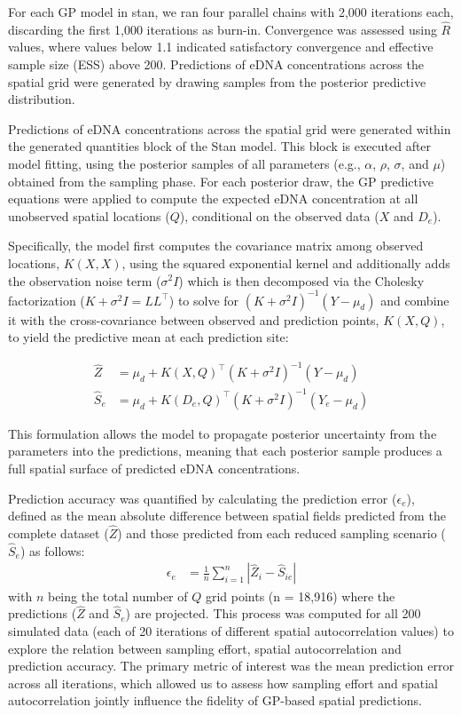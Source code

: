 \documentclass{article}
\begin{document}
For each GP model in stan, we ran four parallel chains with 2,000 iterations each, discarding the first 1,000 iterations as burn-in. Convergence was assessed using $\hat{R}$ values, where values below 1.1 indicated satisfactory convergence and effective sample size (ESS) above 200. Predictions of eDNA concentrations across the spatial grid were generated by drawing samples from the posterior predictive distribution.


Predictions of eDNA concentrations across the spatial grid were generated within the generated quantities block of the Stan model. This block is executed after model fitting, using the posterior samples of all parameters (e.g., $\alpha$, $\rho$, $\sigma$, and $\mu$) obtained from the sampling phase. For each posterior draw, the GP predictive equations were applied to compute the expected eDNA concentration at all unobserved spatial locations ($Q$), conditional on the observed data ($X$ and $D_e$).

Specifically, the model first computes the covariance matrix among observed locations, $K(X, X)$, using the squared exponential kernel and additionally adds the observation noise term ($\sigma^2 I$) which is then decomposed via the Cholesky factorization ($K + \sigma^2 I = LL^\top$) to solve for $(K + \sigma^2 I)^{-1}(Y - \mu_d)$ and combine it with the cross-covariance between observed and prediction points, $K(X, Q)$, to yield the predictive mean at each prediction site:

\begin{align}
\hat{Z} &= \mu_d + K(X, Q)^\top (K + \sigma^2 I)^{-1}(Y - \mu_d) \label{eq:Zhat} \\
\hat{S}_e &= \mu_d + K(D_e, Q)^\top (K + \sigma^2 I)^{-1}(Y_e - \mu_d) \label{eq:Shat}
\end{align}

This formulation allows the model to propagate posterior uncertainty from the parameters into the predictions, meaning that each posterior sample produces a full spatial surface of predicted eDNA concentrations. 

Prediction accuracy was quantified by calculating the prediction error ($\epsilon_e$), defined as the mean absolute difference between spatial fields predicted from the complete dataset ($\hat{Z}$) and those predicted from each reduced sampling scenario ($\hat{S}_e$) as follows:
\begin{align}
\epsilon_e &= \frac{1}{n} \sum_{i=1}^{n}{| \hat{Z}_i - \hat{S}_{ie}|}
\end{align}
with $n$ being the total number of $Q$ grid points (n = 18,916) where the predictions ($\hat{Z}$ and $\hat{S}_e$) are projected. This process was computed for all 200 simulated data (each of 20 iterations of different spatial autocorrelation values) to explore the relation between sampling effort, spatial autocorrelation and prediction accuracy. The primary metric of interest was the mean prediction error across all iterations, which allowed us to assess how sampling effort and spatial autocorrelation jointly influence the fidelity of GP-based spatial predictions.
\end{document}
